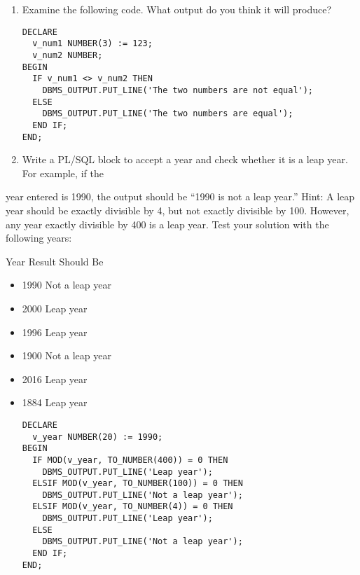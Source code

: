 \documentclass[11pt]{article}
\begin{document}
\begin{enumerate}
\item Examine the following code. What output do you think it will produce?

\begin{verbatim}
DECLARE
  v_num1 NUMBER(3) := 123;
  v_num2 NUMBER;
BEGIN
  IF v_num1 <> v_num2 THEN
    DBMS_OUTPUT.PUT_LINE('The two numbers are not equal');
  ELSE
    DBMS_OUTPUT.PUT_LINE('The two numbers are equal');
  END IF;
END;

\end{verbatim}

\item Write a PL/SQL block to accept a year and check whether it is a leap year. For example, if the
\end{enumerate}
year entered is 1990, the output should be “1990 is not a leap year.”
Hint: A leap year should be exactly divisible by 4, but not exactly divisible by 100. However, any
year exactly divisible by 400 is a leap year.
Test your solution with the following years:

Year Result Should Be

\begin{itemize}
\item 1990 Not a leap year
\item 2000 Leap year
\item 1996 Leap year
\item 1900 Not a leap year
\item 2016 Leap year
\item 1884 Leap year

\begin{verbatim}
DECLARE
  v_year NUMBER(20) := 1990;
BEGIN
  IF MOD(v_year, TO_NUMBER(400)) = 0 THEN
    DBMS_OUTPUT.PUT_LINE('Leap year');
  ELSIF MOD(v_year, TO_NUMBER(100)) = 0 THEN
    DBMS_OUTPUT.PUT_LINE('Not a leap year');
  ELSIF MOD(v_year, TO_NUMBER(4)) = 0 THEN
    DBMS_OUTPUT.PUT_LINE('Leap year');
  ELSE
    DBMS_OUTPUT.PUT_LINE('Not a leap year');
  END IF;
END;
\end{verbatim}
\end{itemize}
\end{document}
